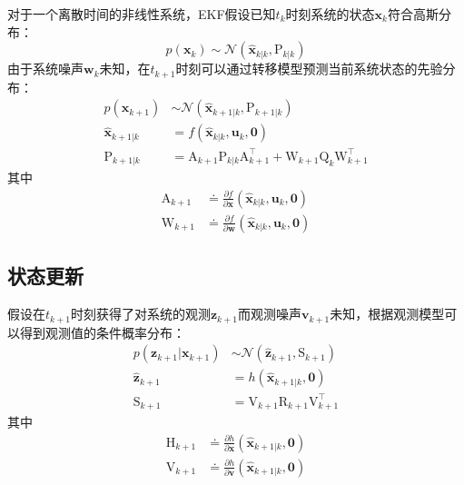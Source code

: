 对于一个离散时间的非线性系统，EKF假设已知$t_k$时刻系统的状态$\bm{x}_k$符合高斯分布：
\begin{equation}
    p(\bm{x}_k) \sim \mathcal{N}(\hat{\bm{x}}_{k|k},\mathrm{P}_{k|k})
\end{equation}
由于系统噪声$\bm{w}_k$未知，在$t_{k+1}$时刻可以通过转移模型预测当前系统状态的先验分布：
\begin{equation}
\begin{aligned}
    p(\bm{x}_{k+1}) &\sim \mathcal{N}(\hat{\bm{x}}_{k+1|k},\mathrm{P}_{k+1|k}) \\
    \hat{\bm{x}}_{k+1|k} &= f(\hat{\bm{x}}_{k|k},\bm{u}_k,\bm{0}) \\
    \mathrm{P}_{k+1|k}   &= \mathrm{A}_{k+1} \mathrm{P}_{k|k} \mathrm{A}_{k+1}^\top +
                            \mathrm{W}_{k+1} \mathrm{Q}_k\mathrm{W}_{k+1}^\top
\end{aligned}
\end{equation}
其中
\begin{equation}
\begin{aligned}
    \mathrm{A}_{k+1} &\doteq
        \frac{\partial f}
             {\partial\bm{x}}(\hat{\bm{x}}_{k|k},\bm{u}_k,\bm{0}) \\
    \mathrm{W}_{k+1} &\doteq
        \frac{\partial f}
             {\partial\bm{w}}(\hat{\bm{x}}_{k|k},\bm{u}_k,\bm{0})
\end{aligned}
\end{equation}

\subsection{状态更新}

假设在$t_{k+1}$时刻获得了对系统的观测$\bm{z}_{k+1}$而观测噪声$\bm{v}_{k+1}$未知，根据观测模型可以得到观测值的条件概率分布：
\begin{equation}
\begin{aligned}
    p(\bm{z}_{k+1}|\bm{x}_{k+1}) &\sim \mathcal{N}(\hat{\bm{z}}_{k+1}, \mathrm{S}_{k+1}) \\
    \hat{\bm{z}}_{k+1} &= h(\hat{\bm{x}}_{k+1|k},\bm{0}) \\
    \mathrm{S}_{k+1} &= \mathrm{V}_{k+1}\mathrm{R}_{k+1}\mathrm{V}_{k+1}^\top
\end{aligned}
\end{equation}
其中
\begin{equation}
\begin{aligned}
    \mathrm{H}_{k+1} &\doteq
        \frac{\partial h}
             {\partial\bm{x}}(\hat{\bm{x}}_{k+1|k},\bm{0}) \\
    \mathrm{V}_{k+1} &\doteq
        \frac{\partial h}
             {\partial\bm{v}}(\hat{\bm{x}}_{k+1|k},\bm{0})
\end{aligned}
\end{equation}

